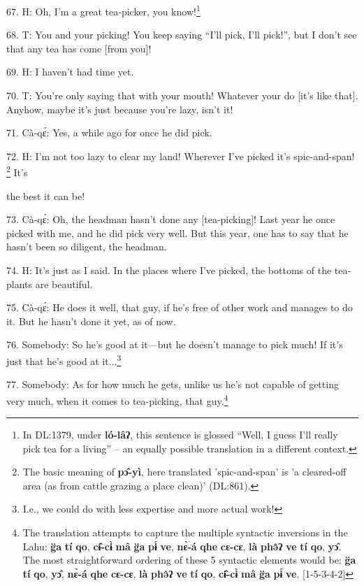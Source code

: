 67. H: Oh, I'm a great tea-picker, you know!\footnote{In DL:1379, under \textbf{ló-lâʔ}, this sentence is glossed ``Well, I guess I'll really pick tea for a living'' -- an equally possible translation in a different context.}

68. T: You and your picking! You keep saying ``I'll pick, I'll pick!'', but I
don't see that any tea has come [from you]!

69. H: I haven't had time yet.

70. T: You're only saying that with your mouth! Whatever your do [it's like that].
Anyhow, maybe it's just because you're lazy, isn't it!

71. Cà-qɛ́: Yes, a while ago for once he did pick.

72. H: I'm not too lazy to clear my land! Wherever I've picked it's spic-and-span!
\footnote{The basic meaning of \textbf{pɔ̂-yì}, here translated 'spic-and-span' is 'a cleared-off area (as from cattle grazing a place clean)' (DL:861).} It's

the best it can be!

73. Cà-qɛ́: Oh, the headman hasn't done any [tea-picking]! Last year he once
picked with me, and he did pick very well. But this year, one has to say that
he hasn't been so diligent, the headman.

74. H: It's just as I said. In the places where I've picked, the bottoms
of the tea-plants are beautiful.

75. Cà-qɛ́: He does it well, that guy, if he's free of other work and manages
to do it. But he hasn't done it yet, as of now.

76. Somebody: So he's good at it---but he doesn't manage to pick much! If it's
just that he's good at it...\footnote{I.e., we could do with less expertise and more actual work!}

77. Somebody: As for how much he gets, unlike us he's not capable of getting very
much, when it comes to tea-picking, that guy.\footnote{The translation attempts to capture the multiple syntactic inversions in the Lahu: \textbf{g̈a} \textbf{tí} \textbf{qo}, \textbf{cɨ̂-cɨ̀} \textbf{mâ} \textbf{g̈a} \textbf{pɨ́} \textbf{ve}, \textbf{nɛ̀-á} \textbf{qhe} \textbf{cɛ-cɛ}, \textbf{là} \textbf{phə̂ʔ} \textbf{ve} \textbf{tí} \textbf{qo}, \textbf{yɔ̂}. The most straightforward ordering of these 5 syntactic elements would be: \textbf{g̈a} \textbf{tí} \textbf{qo}, \textbf{yɔ̂}, \textbf{nɛ̀-á} \textbf{qhe} \textbf{cɛ-cɛ}, \textbf{là} \textbf{phə̂ʔ} \textbf{ve} \textbf{tí} \textbf{qo}, \textbf{cɨ̂-cɨ̀} \textbf{mâ} \textbf{g̈a} \textbf{pɨ́} \textbf{ve}. [1-5-3-4-2]}

